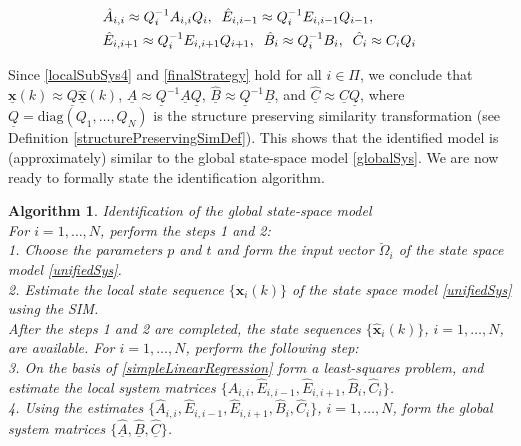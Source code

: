 \documentclass[journal,10pt]{IEEEtran}
\newtheorem{algorithm}[thm]{Algorithm}
\begin{document}
\begin{small}
\begin{align}
&\hat{A}_{i,i}\approx Q_{i}^{-1}A_{i,i}Q_{i},\;\; \hat{E}_{i,i-1}\approx Q_{i}^{-1}E_{i,i-1}Q_{i-1}, \notag \\ & \hat{E}_{i,i+1}\approx Q_{i}^{-1}E_{i,i+1}Q_{i+1},\;\; 
\hat{B}_{i}\approx Q_{i}^{-1}B_{i},\;\; \hat{C}_{i}\approx C_{i}Q_{i}
\label{finalStrategy}
\end{align}
\end{small}
Since \eqref{localSubSys4} and \eqref{finalStrategy} hold for all $i\in \Pi$, we conclude that $\underline{\mathbf{x}}(k)\approx \underline{Q}\hat{\underline{\mathbf{x}}}(k)$, $\underline{\hat{A}}\approx \underline{Q}^{-1} \underline{A}\underline{Q}$, $\hat{\underline{B}}\approx \underline{Q}^{-1} \underline{B}$, and $\hat{\underline{C}}\approx \underline{C}\underline{Q}$,
where $\underline{Q}=\text{diag}(Q_{1},\ldots, Q_{N})$ is the structure preserving similarity transformation (see Definition \ref{structurePreservingSimDef}). This shows that the identified model is (approximately) similar to the global state-space model \eqref{globalSys}. We are now ready to formally state the identification algorithm.
\\
\begin{algorithm} \textit{Identification of the global state-space model}\\
For $i=1,\ldots,N$, perform the steps 1 and 2: \\ 
1. Choose the parameters $p$ and $t$ and form the input vector $\breve{\Omega}_{i}$  of the state space model \eqref{unifiedSys}.\\
 2. Estimate the local state sequence $\{\mathbf{x}_{i}(k)\}$ of the state space model \eqref{unifiedSys} using the SIM.\\
After the steps 1 and 2 are completed, the state sequences $\{\hat{\mathbf{x}}_{i}(k)\}$, $i=1,\ldots,N$, are available. For $i=1,\ldots,N$, perform the following step:\\
  3. On the basis of \eqref{simpleLinearRegression} form a least-squares problem, and estimate the local system matrices $\{\hat{A}_{i,i}, \hat{E}_{i,i-1}, \hat{E}_{i,i+1}, \hat{B}_{i}, \hat{C}_{i}\}$. \\
  4. Using the estimates $\{\hat{A}_{i,i}, \hat{E}_{i,i-1}, \hat{E}_{i,i+1}, \hat{B}_{i}, \hat{C}_{i}\}$, $i=1,\ldots,N$, form the global system matrices $\{ \underline{\hat{A}},\underline{\hat{B}}, \underline{\hat{C}}\}$.
\label{identificationAlgorithm}
\end{algorithm}
\end{document}
